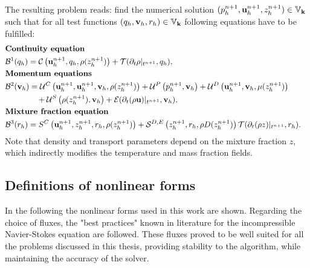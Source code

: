 The resulting problem reads: find the numerical solution $(p^{n+1}_h,\vec{u}^{n+1}_h,z^{n+1}_h)\in \mathbb{V}_\myvector{k}$ such that for all test functions $(q_h,\vec{v}_h,r_h)\in \mathbb{V}_\myvector{k}$ following equations have to be fulfilled:
\begin{subequations}
	\begin{flalign}
		&\textbf{Continuity equation}& \notag \\
		&\mathcal{B}^1(q_h)=\mathcal{C}\left(\vec{u}^{n+1}_h,q_h, \rho(z^{n+1}_h)\right)  + \mathcal{T}(\partial_t \rho|_{t^{n+1}},q_h ) ,& \label{DiscretizedConti2}\\
		&\textbf{Momentum equations}& \notag \\
		&\mathcal{B}^2(\vec{v}_h) =\mathcal{U}^C\left(\vec{u}^{n+1}_h,\vec{u}^{n+1}_h,\vec{v}_h, \rho(z^{n+1}_h)\right)+ 	\mathcal{U}^P\left(p^{n+1}_h,\vec{v}_h\right) +\mathcal{U}^D\left(\vec{u}^{n+1}_h,\vec{v}_h,\mu(z^{n+1}_h)\right)&\notag \\
		&\qquad\qquad	+\mathcal{U}^S\left(\rho(z^{n+1}_h), \vec{v}_h\right) + \mathcal{E}(\partial_t (\rho \vec{u})|_{t^{n+1}},\vec{v}_h ),& \label{DiscretizedMomentum2}\\ 
		&\textbf{Mixture fraction equation}& \notag \\
		&\mathcal{B}^3(r_h) = {S}^C\left(\vec{u}^{n+1}_h,z^{n+1}_h,r_h, \rho(z^{n+1}_h)\right) + \mathcal{S}^{D,E}\left(z^{n+1}_h,r_h,\rho D(z^{n+1}_h)\right)  \mathcal{T}(\partial_t (\rho z)|_{t^{n+1}},r_h ).& \label{DiscretizedEnergy2}
	\end{flalign}\label{eqs:variatFS}
\end{subequations}
Note that density and transport parameters depend on the mixture fraction $z$, which indirectly modifies the temperature and mass fraction fields.%

\subsection{Definitions of nonlinear forms}\label{ssec:nonLinearforms}
In the following the nonlinear forms used in this work are shown. Regarding the choice of fluxes, the "best practices" known in literature for the incompressible Navier-Stokes equation are followed. These fluxes proved to be well suited for all the problems discussed in this thesis, providing stability to the algorithm, while maintaining the accuracy of the solver.

